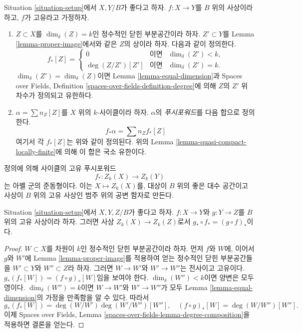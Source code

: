 \begin{definition}
\label{definition-proper-pushforward}
Situation \ref{situation-setup}에서 $X, Y/B$가 좋다고 하자.
$f : X \to Y$를 $B$ 위의 사상이라 하고, $f$가 고유라고 가정하자.
\begin{enumerate}
\item $Z \subset X$를 $\dim_\delta(Z) = k$인 정수적인 닫힌
부분공간이라 하자. $Z' \subset Y$를 Lemma \ref{lemma-proper-image}에서와
같은 $Z$의 상이라 하자. 다음과 같이 정의한다.
$$
f_*[Z] =
\left\{
\begin{matrix}
0 & \text{이면} & \dim_\delta(Z')< k, \\
\deg(Z/Z') [Z'] & \text{이면} & \dim_\delta(Z') = k.
\end{matrix}
\right.
$$
$\dim_\delta(Z') = \dim_\delta(Z)$이면 Lemma
\ref{lemma-equal-dimension}과 Spaces over Fields, Definition
\ref{spaces-over-fields-definition-degree}에 의해 $Z$의 $Z'$ 위 차수가
정의되고 유한하다.
\item $\alpha = \sum n_Z [Z]$를 $X$ 위의 $k$-사이클이라 하자.
$\alpha$의 {\it 푸시포워드}를 다음 합으로 정의한다.
$$
f_* \alpha = \sum n_Z f_*[Z]
$$
여기서 각 $f_*[Z]$는 위와 같이 정의된다. 위의 Lemma
\ref{lemma-quasi-compact-locally-finite}에 의해 이 합은 국소 유한이다.
\end{enumerate}
\end{definition}

\noindent
정의에 의해 사이클의 고유 푸시포워드
$$
f_* : Z_k(X) \longrightarrow Z_k(Y)
$$
는 아벨 군의 준동형이다.
이는 $X \mapsto Z_k(X)$를, 대상이 $B$ 위의 좋은 대수 공간이고 사상이
$B$ 위의 고유 사상인 범주 위의 공변 함자로 만든다.

\begin{lemma}
\label{lemma-compose-pushforward}
Situation \ref{situation-setup}에서 $X, Y, Z/B$가 좋다고 하자.
$f : X \to Y$와 $g : Y \to Z$를 $B$ 위의 고유 사상이라 하자.
그러면 사상 $Z_k(X) \to Z_k(Z)$로서
$g_* \circ f_* = (g \circ f)_*$이다.
\end{lemma}

\begin{proof}
$W \subset X$를 차원이 $k$인 정수적인 닫힌 부분공간이라 하자.
먼저 $f$와 $W$에, 이어서 $g$와 $W'$에 Lemma
\ref{lemma-proper-image}를 적용하여 얻는 정수적인 닫힌 부분공간들을
$W' \subset Y$와 $W'' \subset Z$라 하자. 그러면 $W \to W'$와
$W' \to W''$는 전사이고 고유이다.
$g_*(f_*[W]) = (f \circ g)_*[W]$임을 보여야 한다.
$\dim_\delta(W'') < k$이면 양변은 모두 영이다.
$\dim_\delta(W'') = k$이면 $W \to W'$와 $W' \to W''$가 모두
Lemma \ref{lemma-equal-dimension}의 가정을 만족함을 알 수 있다. 따라서
$$
g_*(f_*[W]) = \deg(W/W')\deg(W'/W'')[W''],
\quad
(f \circ g)_*[W] = \deg(W/W'')[W''].
$$
이제 Spaces over Fields, Lemma
\ref{spaces-over-fields-lemma-degree-composition}을 적용하면 결론을 얻는다.
\end{proof}

